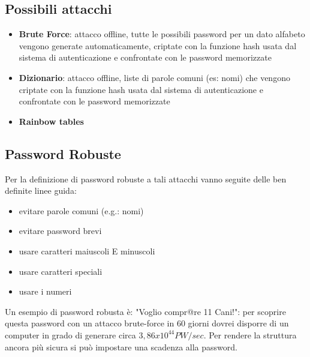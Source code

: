 \subsection{Possibili attacchi}
\begin{itemize} 
  \item \textbf{Brute Force}: attacco offline, tutte le possibili password per un dato alfabeto vengono generate automaticamente, criptate con la funzione hash usata dal sistema di autenticazione e confrontate con le password memorizzate
  \item \textbf{Dizionario}: attacco offline, liste di parole comuni (es: nomi) che vengono criptate con la funzione hash usata dal sistema di autenticazione e confrontate con le password memorizzate
  \item \textbf{Rainbow tables}
\end{itemize}
\subsection{Password Robuste}
Per la definizione di password robuste a tali attacchi vanno seguite delle ben definite linee guida:
\begin{itemize}
  \item evitare parole comuni (e.g.: nomi)
  \item evitare password brevi
  \item usare caratteri maiuscoli E minuscoli
  \item usare caratteri speciali
  \item usare i numeri
\end{itemize}
Un esempio di password robusta è: "Voglio compr@re 11 Cani!": per scoprire questa password con un attacco brute-force in 60 giorni dovrei disporre di un computer in grado di generare circa $3,86 x 10^{44} PW/sec$. Per rendere la struttura ancora più sicura si può impostare una scadenza alla password.

